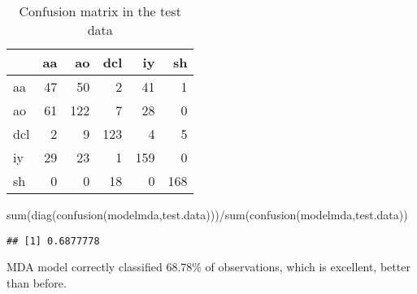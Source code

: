 \documentclass[
]{article}
\newenvironment{Shaded}{\begin{snugshade}}{\end{snugshade}}
\newcommand{\FunctionTok}[1]{\textcolor[rgb]{0.00,0.00,0.00}{#1}}
\newcommand{\NormalTok}[1]{#1}
\newcommand{\SpecialCharTok}[1]{\textcolor[rgb]{0.00,0.00,0.00}{#1}}
\begin{document}
\begin{table}

\caption{\label{tab:unnamed-chunk-37}Confusion matrix in the test data}
\centering
\begin{tabular}[t]{l|r|r|r|r|r}
\hline
  & aa & ao & dcl & iy & sh\\
\hline
aa & 47 & 50 & 2 & 41 & 1\\
\hline
ao & 61 & 122 & 7 & 28 & 0\\
\hline
dcl & 2 & 9 & 123 & 4 & 5\\
\hline
iy & 29 & 23 & 1 & 159 & 0\\
\hline
sh & 0 & 0 & 18 & 0 & 168\\
\hline
\end{tabular}
\end{table}

\begin{Shaded}
\begin{Highlighting}[]
\FunctionTok{sum}\NormalTok{(}\FunctionTok{diag}\NormalTok{(}\FunctionTok{confusion}\NormalTok{(modelmda,test.data)))}\SpecialCharTok{/}\FunctionTok{sum}\NormalTok{(}\FunctionTok{confusion}\NormalTok{(modelmda,test.data))}
\end{Highlighting}
\end{Shaded}

\begin{verbatim}
## [1] 0.6877778
\end{verbatim}

MDA model correctly classified 68.78\% of observations, which is
excellent, better than before.
\end{document}
